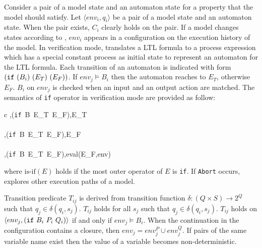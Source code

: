 \documentclass[12pt,a4paper,titlepage]{article}
\theoremstyle{break}
\begin{document}
Consider a pair of a model state and an automaton state for a property that the model should satisfy.
Let \(\langle env_i,q_i\rangle\) be a pair of a model state and an automaton state.
When the pair exists, \(C_{i}\) clearly holds on the pair.
If a model changes states according to , \(env_i\) appears in a configuration on the execution history of the model.
In verification mode, \NHK translates a LTL formula to a process expression which has a special constant process as initial state to represent an automaton for the LTL formula.
Each transition of an automaton is indicated with form \(({\tt if}\ (B_i)\ (E_T)\ (E_F))\).
If \(env_j\models B_i\) then the automaton reaches to \(E_T\), otherwise \(E_F\).
\(B_i\) on \(env_j\) is checked when an input and an output action are matched.
The semantics of {\tt if} operator in verification mode are provided as follow:
\begin{center}
  \begin{tabular}{c}
{\langle[(P,env),k,ch],({\tt if}\ B\ E_T\ E_F)\rangle\trans{ }\langle[(P',env'),k',ch'],E_T\rangle}
\\\\
{\langle[(P,env),k,ch],({\tt if}\ B\ E_T\ E_F)\rangle\trans{ }\langle[(P',env'),k',ch'],E_F\rangle}
\\\\
{\langle[(P,env),k,ch],({\tt if}\ B\ E_T\ E_F)\rangle\trans{ }\langle[(P',env'),k',ch'],\mbox{eval}(E_F,env)\rangle}
  \end{tabular}
\end{center}
where \(\mbox{is-if}(E)\) holds if the most outer operator of \(E\) is {\tt if}.
If {\tt Abort} occurs, \NHK explores other execution paths of a model.

Transition predicate \(T_{ij}\) is derived from transition function \(\delta: (Q\times S)\rightarrow 2^Q\) such that \(q_j\in\delta(q_i,s_j)\).
\(T_{ij}\) holds for all \(s_j\) such that \(q_j\in\delta(q_i,s_j)\).
\(T_{ij}\) holds on \(\langle env_j, ({\tt if}\ B_i\ P_i\ Q_i)\rangle\) if and only if \(env_j\models B_i\).
When the continuation in the configuration contains a closure, then \(env_j=env_j^P\cup env_j^Q\).
If pairs of the same variable name exist then the value of a variable becomes non-deterministic.
\end{document}
